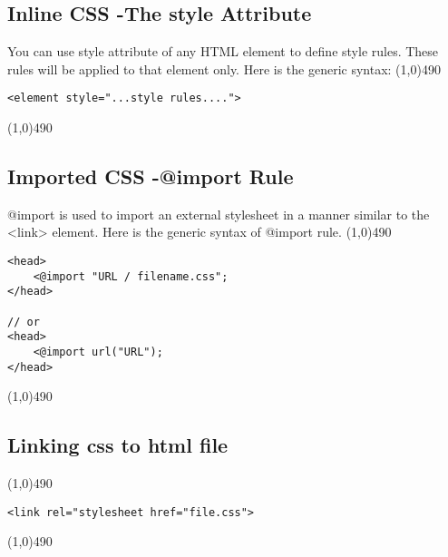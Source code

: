 \documentclass{report}
\begin{document}
    \bigbreak \noindent 
    \subsection{Inline CSS -The style Attribute}
    \bigbreak \noindent 
    You can use style attribute of any HTML element to define style rules. These
rules will be applied to that element only. Here is the generic syntax:
\bigbreak \noindent 
\line(1,0){490}
\begin{verbatim}
<element style="...style rules....">
\end{verbatim}
\line(1,0){490}
\bigbreak \noindent 
    \subsection{Imported CSS -@import Rule}
    \bigbreak \noindent 
    @import is used to import an external stylesheet in a manner similar to the <link> element. Here is the generic syntax of @import rule.
    \bigbreak \noindent 
    \line(1,0){490}
    \begin{verbatim}
<head>
    <@import "URL / filename.css";
</head>

// or 
<head>
    <@import url("URL");
</head>
    \end{verbatim}
    \line(1,0){490}

    \pagebreak \bigbreak \noindent 
    \subsection{Linking css to html file}
    \bigbreak \noindent 
    \line(1,0){490}
    \begin{verbatim}
<link rel="stylesheet href="file.css">
    \end{verbatim}
    \line(1,0){490}


    \pagebreak  \bigbreak \noindent 
\end{document}
